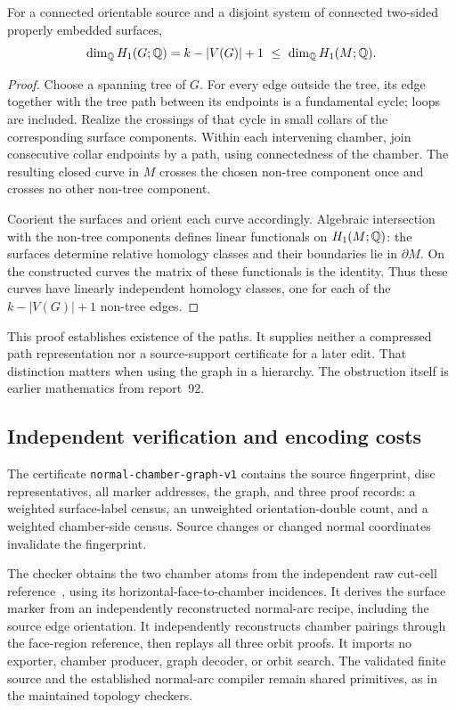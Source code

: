 \begin{proposition}
\label{prop:cycle-obstruction}
For a connected orientable source and a disjoint system of connected
two-sided properly embedded surfaces,
\[
 \dim_{\mathbb Q}H_1(G;\mathbb Q)=k-|V(G)|+1
 \ \le\ \dim_{\mathbb Q}H_1(M;\mathbb Q).
\]
\end{proposition}
\begin{proof}
Choose a spanning tree of $G$. For every edge outside the tree, its edge
together with the tree path between its endpoints is a fundamental cycle;
loops are included. Realize the crossings of that cycle in small collars
of the corresponding surface components. Within each intervening chamber,
join consecutive collar endpoints by a path, using connectedness of the
chamber. The resulting closed curve in $M$ crosses the chosen non-tree
component once and crosses no other non-tree component.

Coorient the surfaces and orient each curve accordingly. Algebraic
intersection with the non-tree components defines linear functionals on
$H_1(M;\mathbb Q)$: the surfaces determine relative homology classes and their
boundaries lie in $\partial M$. On the constructed curves the matrix of
these functionals is the identity. Thus these curves have linearly
independent homology classes, one for each of the $k-|V(G)|+1$ non-tree
edges.
\end{proof}

This proof establishes existence of the paths. It supplies neither a
compressed path representation nor a source-support certificate for a
later edit. That distinction matters when using the graph in a hierarchy.
The obstruction itself is earlier mathematics from report~92.

\subsection{Independent verification and encoding costs}

The certificate \texttt{normal-chamber-graph-v1} contains the source
fingerprint, disc representatives, all marker addresses, the graph, and
three proof records: a weighted surface-label census, an unweighted
orientation-double count, and a weighted chamber-side census. Source changes
or changed normal coordinates invalidate the fingerprint.

The checker obtains the two chamber atoms from the independent raw cut-cell
reference~\cite{cutcells}, using its horizontal-face-to-chamber incidences. It derives the
surface marker from an independently reconstructed normal-arc recipe,
including the source edge orientation. It independently reconstructs chamber
pairings through the face-region reference, then replays all three orbit
proofs. It imports no exporter, chamber producer, graph decoder, or orbit
search. The validated finite source and the established normal-arc compiler
remain shared primitives, as in the maintained topology checkers.

